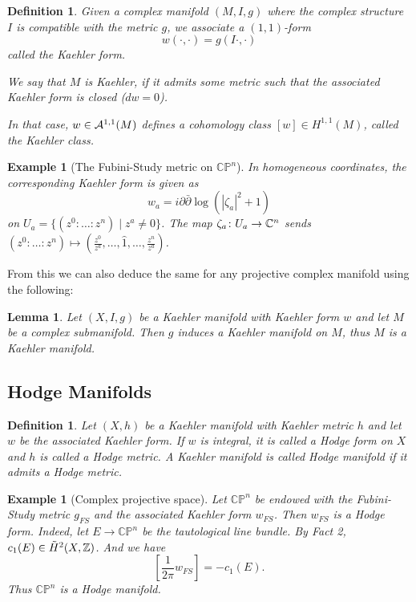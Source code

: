 \documentclass[A4paper, british]{amsart}
\theoremstyle{darkgreentheorem}
\newtheorem{lm}[thm]{Lemma}
\theoremstyle{darkbluedefinition}
\newtheorem{defn}[thm]{Definition}
\theoremstyle{darkredexample}
\newtheorem{exa}[thm]{Example}
\theoremstyle{remark}
\newcommand{\CP}{\mathbb{CP}}
\newcommand{\1}{\mathbbm{1}}
\begin{document}
\begin{defn}
    Given a complex manifold $(M,I,g)$ where the complex structure $I$ is compatible with the metric $g$, we associate a $(1,1)$-form
    \[ w(\cdot,\cdot)=g(I\cdot,\cdot) \]
    called the \textit{Kaehler form}.

    We say that $M$ is Kaehler, if it admits some metric such that the associated Kaehler form is closed ($dw=0$).

    In that case, $w\in \mathcal{A}^{1,1}(M)$ defines a cohomology class $[w]\in H^{1,1}(M)$, called the \textit{Kaehler class}.
\end{defn}

\begin{exa}[The Fubini-Study metric on $\CP^{n}$]
    In homogeneous coordinates, the corresponding Kaehler form is given as
    \[ w_{a}=i\partial \bar{\partial}\log(|\zeta_{a}|^{2}+1) \]
    on $U_{a}=\{(z^{0}:\ldots:z^{n})\mid z^{a}\neq 0\}$.
    The map $\zeta_{a}\colon U_{a}\to \mathbb{C}^{n}$ sends $(z^{0}:\ldots:z^{n})\mapsto (\frac{z^{0}}{z^{a}},\ldots,\hat{1},\ldots,\frac{z^{n}}{z^{a}})$.
\end{exa}

From this we can also deduce the same for any projective complex manifold using the following:

\begin{lm}
    Let $(X,I,g)$ be a Kaehler manifold with Kaehler form $w$ and let $M$ be a complex submanifold.
    Then $g$ induces a Kaehler manifold on $M$, thus $M$ is a Kaehler manifold.
\end{lm}

\subsection{Hodge Manifolds}

\begin{defn}
    Let $(X,h)$ be a Kaehler manifold with Kaehler metric $h$ and let $w$ be the associated Kaehler form.
    If $w$ is integral, it is called a \textit{Hodge form} on $X$ and $h$ is called a \textit{Hodge metric}.
    A Kaehler manifold is called \textit{Hodge manifold} if it admits a Hodge metric.
\end{defn}

\begin{exa}[Complex projective space]
    Let $\CP^{n}$ be endowed with the Fubini-Study metric $g_{FS}$ and the associated Kaehler form $w_{FS}$.
    Then $w_{FS}$ is a Hodge form.
    Indeed, let $E\to \CP^{n}$ be the tautological line bundle.
    By Fact 2, $c_{1}(E)\in \tilde{H}^{2}(X,\mathbb{Z})$.
    And we have
    \[ \left[\frac{1}{2\pi} w_{FS}\right] =-c_{1}(E).\]
    Thus $\CP^{n}$ is a Hodge manifold.
\end{exa}
\end{document}

